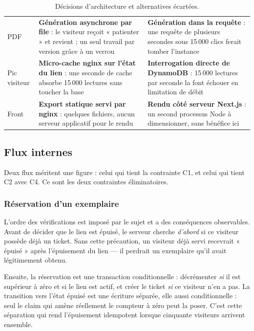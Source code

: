 \begin{table}[H]
\begin{tabular}{@{}p{3.0cm}p{6.2cm}p{6.3cm}@{}}
\addlinespace
PDF
& \textbf{Génération asynchrone par file} : le visiteur reçoit « patienter » et
  revient ; un seul travail par version grâce à un verrou
& \textbf{Génération dans la requête} : une requête de plusieurs secondes sous
  15\,000 clics ferait tomber l'instance \\
\addlinespace
Pic visiteur
& \textbf{Micro-cache nginx sur l'état du lien} : une seconde de cache absorbe
  15\,000 lectures sans toucher la base
& \textbf{Interrogation directe de DynamoDB} : 15\,000 lectures par seconde la
  font échouer en limitation de débit \\
\addlinespace
Front
& \textbf{Export statique servi par nginx} : quelques fichiers, aucun serveur
  applicatif pour le rendu
& \textbf{Rendu côté serveur Next.js} : un second processus Node à
  dimensionner, sans bénéfice ici \\
\bottomrule
\end{tabular}
\caption{Décisions d'architecture et alternatives écartées.}
\label{tab:adr}
\end{table}

\subsection{Flux internes}

Deux flux méritent une figure : celui qui tient la contrainte C1, et celui qui
tient C2 avec C4. Ce sont les deux contraintes éliminatoires.

\subsubsection{Réservation d'un exemplaire}

L'ordre des vérifications est imposé par le sujet et a des conséquences
observables. Avant de décider que le lien est épuisé, le serveur cherche
\emph{d'abord} si ce visiteur possède déjà un ticket. Sans cette précaution, un
visiteur déjà servi recevrait « épuisé » après l'épuisement du lien — il perdrait
un exemplaire qu'il avait légitimement obtenu.

Ensuite, la réservation est une transaction conditionnelle : décrémenter
 \emph{si} il est supérieur à zéro et si le lien est actif, et
créer le ticket \emph{si} ce visiteur n'en a pas. La transition vers l'état
épuisé est une écriture séparée, elle aussi conditionnelle : seul le claim qui
amène réellement le compteur à zéro peut la poser. C'est cette séparation qui
rend l'épuisement idempotent lorsque cinquante visiteurs arrivent ensemble.

